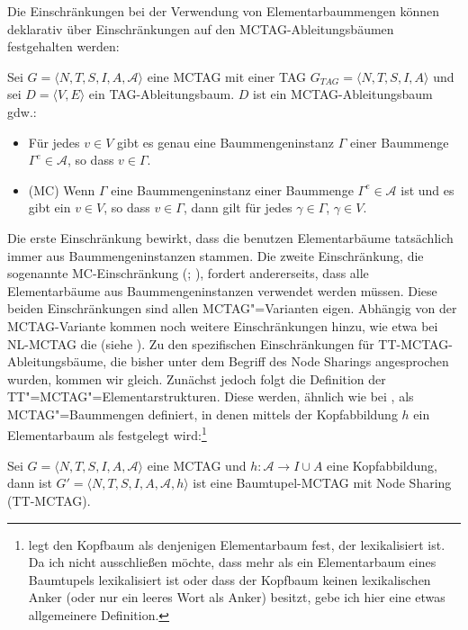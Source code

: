 Die Einschränkungen bei der Verwendung von Elementarbaummengen können deklarativ über Einschränkungen auf den MCTAG-Ableitungsbäumen festgehalten werden:  
\begin{definition}
Sei $G = \langle N,T,S,I,A,\mathcal{A} \rangle$ eine MCTAG mit einer TAG $G_{TAG} = \langle N,T,S,I,A\rangle$ und sei $D = \langle V,E \rangle$ ein  TAG-Ableitungsbaum. $D$ ist ein MCTAG-Ableitungsbaum gdw.:
\begin{itemize}
  \item Für jedes $v \in V$ gibt es genau eine Baummengeninstanz $\Gamma$ einer Baummenge $\Gamma^e \in \mathcal{A}$, so dass $v \in \Gamma$.
  \item (MC) Wenn $\Gamma$ eine Baummengeninstanz einer Baummenge $\Gamma^e \in \mathcal{A}$ ist und es gibt ein $v \in V$, so dass $v \in \Gamma$, dann gilt für jedes $\gamma \in \Gamma$, $\gamma \in V$.
\end{itemize}
\end{definition}
Die erste Einschränkung bewirkt, dass die benutzen Elementarbäume tatsächlich immer aus Baummengeninstanzen stammen. Die zweite Einschränkung, die sogenannte MC-Einschrän\-kung (\citealt[197]{Kallmeyer:05}; \citealt[64]{Kallmeyer:09}), fordert andererseits, dass alle Elementarbäume aus Baummengeninstanzen verwendet werden müssen. Diese beiden Einschränkungen sind allen MCTAG"=Varianten eigen. Abhängig von der MCTAG-Variante kommen noch weitere Einschränkungen hinzu, wie etwa bei NL-MCTAG die  (siehe \citealt[66]{Kallmeyer:09}). Zu den spezifischen Einschränkungen für TT-MCTAG-Ableitungs\-bäume, die bisher unter dem Begriff des Node Sharings angesprochen wurden, kommen wir gleich. Zunächst jedoch folgt die Definition der TT"=MCTAG"=Elementarstrukturen. Diese werden, ähnlich wie bei \citet[71]{Kallmeyer:09}, als MCTAG"=Baummengen definiert, in denen mittels der Kopfabbildung $h$ ein Elementarbaum als  festgelegt wird:\footnote{\citet[71]{Kallmeyer:09} legt den Kopfbaum als denjenigen Elementarbaum fest, der lexikalisiert ist. Da ich nicht ausschlie\ss en möchte, dass mehr als ein Elementarbaum eines Baumtupels lexikalisiert ist oder dass der Kopfbaum keinen lexikalischen Anker (oder nur ein leeres Wort als Anker) besitzt, gebe ich hier eine etwas allgemeinere Definition.}
\begin{definition}[TT-MCTAG]
Sei $G = \langle N,T,S,I,A,\mathcal{A} \rangle$ eine MCTAG und $h: \mathcal{A} \to I\cup A$ eine Kopfabbildung, dann ist $G'= \langle N,T,S,I,A,\mathcal{A},h \rangle$  ist eine Baumtupel-MCTAG mit Node Sharing (TT-MCTAG). 
\end{definition}
